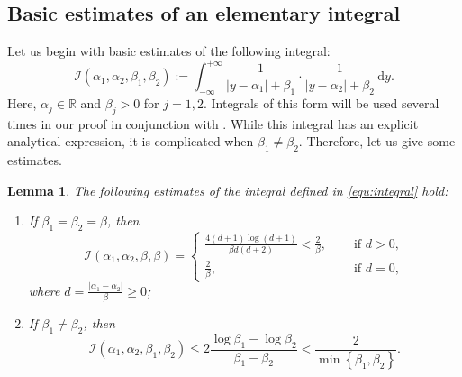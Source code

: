 \documentclass{article}
\theoremstyle{plain}%
\newtheorem{lemma}{Lemma}%
\theoremstyle{definition}%
\theoremstyle{remark}%
\newcommand{\bR}{\mathbb{R}}
\newcommand{\cI}{\mathcal{I}}
\newcommand{\rd}{\mathrm{d}}
\newcommand{\+}[1]{{\bm{#1}}}
\begin{document}
\subsection{Basic estimates of an elementary integral}
Let us begin with basic estimates of the following integral:
\begin{equation}\label{equ:integral}
  \cI(\alpha_1, \alpha_2, \beta_1, \beta_2) := 
  \int_{- \infty}^{+ \infty} \frac{1}{|y - \alpha_1| + \beta_1} 
  \cdot \frac{1}{|y - \alpha_2| + \beta_2} \,\rd y.
\end{equation}
Here, $\alpha_j \in \bR$ and $\beta_j > 0$ for $j = 1, 2$.
Integrals of this form will be used several times in our proof in 
conjunction with . While this integral has an explicit 
analytical expression, it is complicated when 
$\beta_1 \ne \beta_2$. Therefore, let us give some estimates.

\begin{lemma}\label{lemma:integral}
  The following estimates of the integral defined in 
  \cref{equ:integral} hold:
  \begin{enumerate}
    \item If $\beta_1 = \beta_2 = \beta$, then 
    \begin{displaymath}
      \cI(\alpha_1, \alpha_2, \beta, \beta) = 
      \begin{cases}
        \frac{4 (d + 1) \log(d + 1)}{\beta d (d + 2)} 
        < \frac{2}{\beta}, & \quad \text{ if } d > 0, \\
        \frac{2}{\beta}, & \quad \text{ if } d = 0,
      \end{cases}
    \end{displaymath}
    where $d = \frac{|\alpha_1 - \alpha_2|}{\beta} \ge 0$;
    \item If $\beta_1 \ne \beta_2$, then 
    \begin{displaymath}
      \cI(\alpha_1, \alpha_2, \beta_1, \beta_2) \le 
      2 \frac{\log \beta_1 - \log \beta_2}{\beta_1 - \beta_2} <
      \frac{2}{\min \left\{ \beta_1, \beta_2 \right\}}.
    \end{displaymath}
  \end{enumerate}
\end{lemma}
\end{document}
